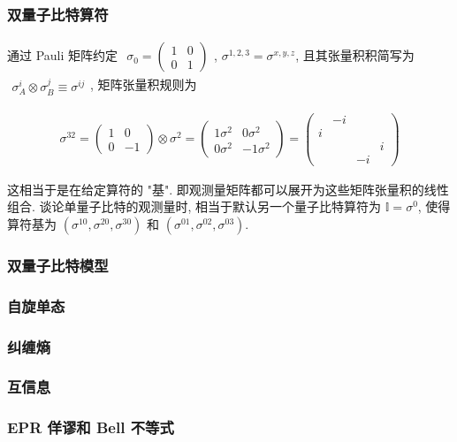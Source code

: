 \documentclass[../../main.tex]{subfiles}
\begin{document}
\subsubsection{双量子比特算符}

通过 Pauli 矩阵约定 $\begin{aligned}
    \sigma_{0} = \begin{pmatrix}
        1 & 0 \\ 0 & 1
    \end{pmatrix}
\end{aligned}$, $\sigma^{1,2,3}=\sigma^{x,y,z}$, 且其张量积积简写为 $\begin{aligned}
    \sigma_{A}^{i}\otimes\sigma_{B}^{j}\equiv \sigma^{ij}
\end{aligned}$, 矩阵张量积规则为

\begin{align*}
    \sigma^{32} = \begin{pmatrix}
        1 & 0 \\ 0 & -1
    \end{pmatrix}\otimes \sigma^{2} = \begin{pmatrix}
1\sigma^{2} & 0\sigma^{2} \\ 0\sigma^{2} & -1\sigma^{2}
    \end{pmatrix} = \begin{pmatrix}
        & -i & & \\
        i &  &  & \\
        &  &  & i \\
        &  & -i &
    \end{pmatrix}
\end{align*}

这相当于是在给定算符的 "基". 即观测量矩阵都可以展开为这些矩阵张量积的线性组合. 谈论单量子比特的观测量时, 相当于默认另一个量子比特算符为 $\mathbb{I} = \sigma^{0}$, 使得算符基为 $(\sigma^{10},\sigma^{20},\sigma^{30})$ 和 $(\sigma^{01},\sigma^{02},\sigma^{03})$.

\subsubsection{双量子比特模型}

\subsubsection{自旋单态}

\subsubsection{纠缠熵}

\subsubsection{互信息}

\subsubsection{EPR 佯谬和 Bell 不等式}
\end{document}
